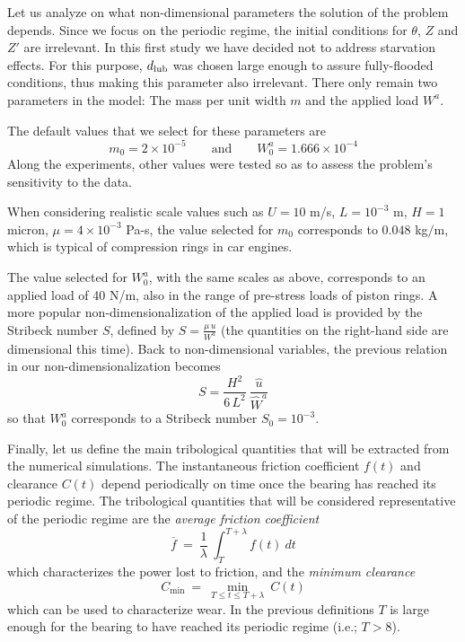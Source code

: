 Let us analyze on what non-dimensional parameters the solution of
the problem depends.
Since we focus on the periodic regime, the initial conditions for
$\theta$, $Z$ and $Z'$ are irrelevant. In this first study we
have decided not to address starvation effects. For this purpose,
$d_{\mbox{\scriptsize{lub}}}$ was chosen
large enough to assure fully-flooded conditions, thus making this
parameter also irrelevant.
There only remain two parameters
in the model: The mass per unit width $m$ and the applied load $W^a$.

The default values that we select for these parameters are
$$
m_0 = 2\times 10^{-5} \qquad \mbox{and} \qquad
W^a_0 = 1.666\times 10^{-4}
$$
Along the experiments, other values were tested so as to
assess the problem's sensitivity to the data.

When considering realistic scale values such as $U=10$ m/s, $L = 10^{-3}$ m,
$H = 1$ micron, $\mu = 4\times 10^{-3}$ Pa-s, the value selected
for $m_0$ corresponds to
$0.048$ kg$/$m, which is typical of compression rings in car engines.

The value selected for $W^a_0$, with the same scales as above,
corresponds to an applied load of 40 N/m, also in the range of
pre-stress loads of piston rings. A more popular non-dimensionalization
of the applied load is provided by the Stribeck number $S$,
defined by $S = \frac{\mu\,u}{W^{a}}$ (the quantities on the right-hand
side are dimensional this time). 
Back to non-dimensional variables, the previous relation 
in our non-dimensionalization becomes
\begin{equation}
S = \frac{H^2}{6\,L^2}~\frac{\hat{u}}{\hat{W}^{a}}
\label{stribeck2}
\end{equation}
so that $W^a_0$ corresponds to a Stribeck number $S_0 = 10^{-3}$.

Finally, let us define the main tribological quantities that will
be extracted from the numerical simulations.
The instantaneous friction coefficient $f(t)$ and clearance $C(t)$
depend periodically on time once the bearing has reached its periodic
regime. The tribological quantities that will be considered representative
of the periodic regime are the {\em average friction coefficient}
\begin{equation}
\overline{f} ~=~\frac{1}{\lambda}~\int_T^{T+\lambda}f(t)~dt
\end{equation}
which characterizes the power lost to friction,
and the {\em minimum clearance}
\begin{equation}
C_{\min}~=~\min_{T\leq t \leq T+\lambda}~C(t)
\end{equation}
which can be used to characterize wear. In the previous definitions
$T$ is large enough for the bearing to have reached its periodic regime
(i.e.; $T>8$).


